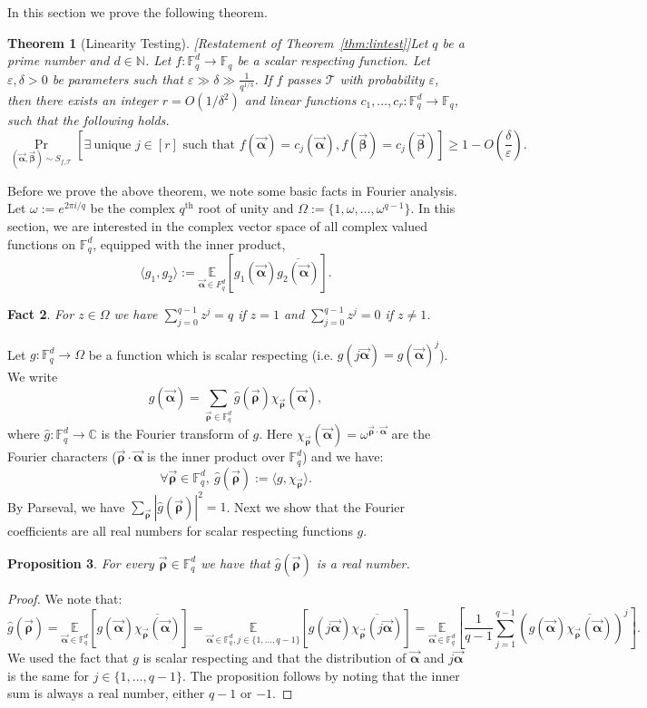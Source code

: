 \documentclass[10pt,a4paper]{article}
\newcommand{\F}{\mathbb{F}}
\renewcommand{\ge}{ \geqslant}
\newtheorem{theorem}{Theorem}[section]
\newtheorem{proposition}[theorem]{Proposition}
\newtheorem{fact}[theorem]{Fact}
\renewcommand{\epsilon}{\varepsilon}
\newcommand{\alphab}{\vec{\bm{\alpha}}}
\newcommand{\betab}{\vec{\bm{\beta}}}
\newcommand{\rhob}{\vec{\bm{\rho}}}
\begin{document}
In this section we prove the following theorem. 

\begin{theorem}[Linearity Testing][Restatement of Theorem~\ref{thm:lintest}]\label{thm:linearitytest}
Let $q$ be a prime number and $d\in \mathbb{N}$.
Let $f:\F_q^d\to\F_q$ be a scalar respecting function. Let $\epsilon, \delta > 0$ be parameters such that 
$\epsilon \gg \delta \gg \frac{1}{q^{1/3}}$. 
If $f$  passes $\mathcal{T}$ with probability $\varepsilon$, then  there exists an integer $r = O(1/\delta^2)$ and 
\emph{linear} functions $c_1,\ldots ,c_r:\F_q^d\to\F_q$, such that the following holds.
$$
\underset{ (\alphab, \betab) \sim S_{f,\mathcal{T}} }{\Pr}\left[\exists\ \text{unique } j\in[r] \text{ such that }f(\alphab)=c_j(\alphab),
 f(\betab)=c_j(\betab) \right]\ge 1- O\left(\frac{\delta}{\epsilon}\right).
$$
\end{theorem}

Before we prove the above theorem, we note some basic facts in Fourier analysis.  
Let $\omega:=e^{2\pi i/q}$ be the complex $q^{\text{th}}$ root of unity and $\Omega :=\{1,\omega,\ldots,\omega^{q-1}\}$.
In this section, we are interested in the complex vector space of all complex valued functions on $\F_q^d$, equipped with the inner product,
$$
\langle g_1,g_2\rangle:=\underset{\alphab\in F_q^d}{\mathbb{E}}[g_1(\alphab)\overline{g_2(\alphab)}].
$$

%
\begin{fact}\label{fact}
For  $z\in\Omega$ we have $\sum_{j=0}^{q-1} z^{j}=q$ if $z=1$ and  $\sum_{j=0}^{q-1} z^{j}=0$ if $z\neq 1$.
\end{fact}

Let $g:\F_q^d\to\Omega$ be a function which is scalar respecting (i.e. $g(j \alphab) = g(\alphab)^j$).  We write $$g(\alphab) = \underset{\rhob\in\F_q^d}{\sum}\hat{g}(\rhob)\chi_{\rhob}(\alphab),$$ 
where $\hat{g}:\F_q^d\to \mathbb{C}$ is the Fourier transform of $g$. Here 
$\chi_{\rhob}(\alphab) = \omega^{\rhob \cdot \alphab}$ are the Fourier characters ($\rhob \cdot \alphab$ is the inner product over $\F_q^d$)
 and we have:
$$
\forall \rhob\in\F_q^d,\ \hat{g}(\rhob):= \langle g,\chi_{\rhob}\rangle.
$$
By Parseval, we have $\sum_{\rhob} |\hat{g}(\rhob)|^2 =1$. 
Next we show that the Fourier coefficients are all real numbers for scalar respecting functions $g$. 

\begin{proposition}
For every $\rhob\in\F_q^d$ we have that $\hat{g}(\rhob)$ is a real number.
\end{proposition}\begin{proof} We note that:
$$
\hat{g}(\rhob) 
=\underset{\alphab\in\F_q^d}{\mathbb{E}}[g(\alphab)\overline{\chi_{\rhob}(\alphab)}]
= \underset{\alphab\in\F_q^d, j \in \{1,\ldots,q-1\}}{\mathbb{E}}[g(j\alphab)\overline{\chi_{\rhob}(j\alphab)}]
= \underset{\alphab\in\F_q^d }{\mathbb{E}}\left[ \frac{1}{q-1} \sum_{j=1}^{q-1}  (g(\alphab)\overline{\chi_{\rhob}(\alphab)})^j\right].  
$$
We used the fact that $g$ is scalar respecting and that the distribution of
$\alphab$ and $j \alphab$ is the same for $j \in \{1,\ldots,q-1\}$. The proposition follows by noting that 
the inner sum is always a real number, either $q-1$ or $-1$. 
%
%
%
%
%
%
%
\end{proof}
\end{document}
